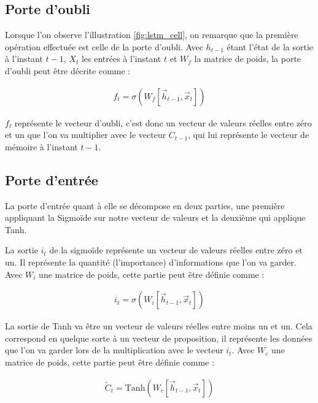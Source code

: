 \subsection{Porte d'oubli}

Lorsque l’on observe l’illustration \ref{fig:lstm_cell}, on remarque que la première opération effectuée est celle de la porte d’oubli. Avec $h_{t-1}$ étant l’état de la sortie à l’instant $t-1$, $X_{t}$ les entrées à l’instant $t$ et $W_{f}$ la matrice de poids, la porte d’oubli peut être décrite comme :

{\Large
	\setlength{\abovedisplayskip}{-0.5cm}
	\begin{gather*}
		f_{t} = \sigma(W_{f}[\overrightarrow{h}_{t-1}, \overrightarrow{x}_{t}])
	\end{gather*}
}

$f_{t}$ représente le vecteur d’oubli, c’est donc un vecteur de valeurs réelles entre zéro et un que l’on va multiplier avec le vecteur $C_{t-1}$, qui lui représente le vecteur de mémoire à l’instant $t-1$.

\subsection{Porte d'entrée}

La porte d’entrée quant à elle se décompose en deux parties, une première appliquant la Sigmoïde sur notre vecteur de valeurs et la deuxième qui applique Tanh.

La sortie $i_{t}$ de la sigmoïde représente un vecteur de valeurs réelles entre zéro et un. Il représente la quantité (l’importance) d’informations que l’on va garder. Avec $W_{i}$ une matrice de poids, cette partie peut être définie comme :

{\Large
	\setlength{\abovedisplayskip}{-0.5cm}
	\begin{gather*}
		i_{t} = \sigma(W_{i}[\overrightarrow{h}_{t-1}, \overrightarrow{x}_{t}])
	\end{gather*}
}

La sortie de Tanh va être un vecteur de valeurs réelles entre moins un et un. Cela correspond en quelque sorte à un vecteur de proposition, il représente les données que l’on va garder lors de la multiplication avec le vecteur $i_{t}$. Avec $W_{c}$ une matrice de poids, cette partie peut être définie comme :

{\Large
	\setlength{\abovedisplayskip}{-0.5cm}
	\begin{gather*}
		\tilde{C}_{t} = \text{Tanh}(W_{c}[\overrightarrow{h}_{t-1}, \overrightarrow{x}_{t}])
	\end{gather*}
}

